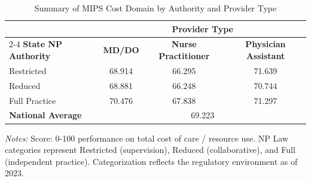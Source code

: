 \begin{table}[htbp]
    \centering
    \caption{Summary of MIPS Cost Domain by Authority and Provider Type}
    \label{tab:mips_cost_score_provtype}
    \vspace{0.2cm}
    \begin{tabular}{lccc}
        \toprule
        & \multicolumn{3}{c}{\textbf{Provider Type}} \\
        \cmidrule(lr){2-4}
        \textbf{State NP Authority} & \textbf{MD/DO} & \textbf{Nurse Practitioner} & \textbf{Physician Assistant} \\
        \midrule
        Restricted & 68.914 & 66.295 & 71.639 \\
        Reduced & 68.881 & 66.248 & 70.744 \\
        Full Practice & 70.476 & 67.838 & 71.297 \\
        \midrule
        \textbf{National Average} & \multicolumn{3}{c}{69.223} \\
        \bottomrule
    \end{tabular}
    \vspace{0.1cm}
    \begin{minipage}{0.85\textwidth}
        \footnotesize \textit{Notes:} Score: 0-100 performance on total cost of care / resource use. NP Law categories represent Restricted (supervision), Reduced (collaborative), and Full (independent practice). Categorization reflects the regulatory environment as of 2023.
    \end{minipage}
\end{table}